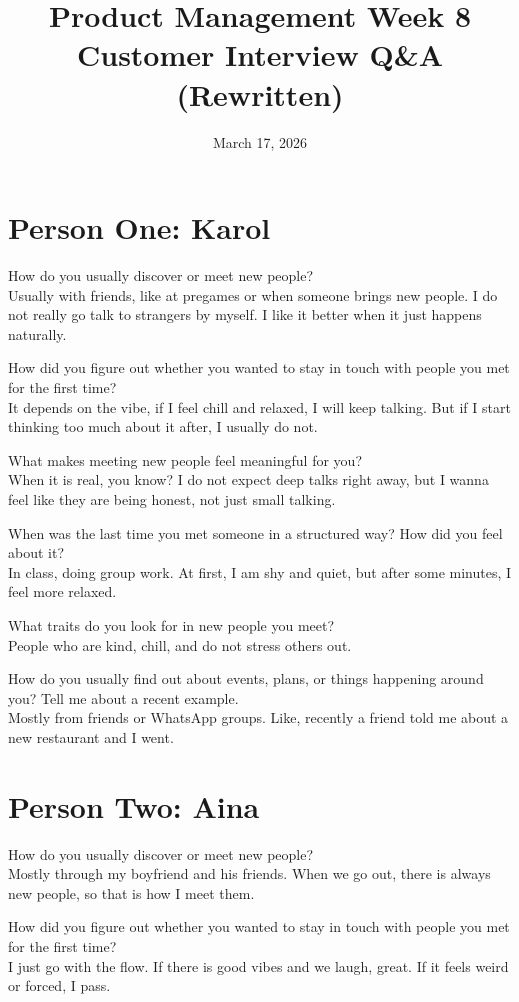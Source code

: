 \documentclass[11pt]{article}
\title{Product Management Week 8\\Customer Interview Q\&A (Rewritten)}
\author{March 17, 2026}
\date{}
\begin{document}
\maketitle

\section*{Person One: Karol}
How do you usually discover or meet new people?\\
Usually with friends, like at pregames or when someone brings new people. I do not really go talk to strangers by myself. I like it better when it just happens naturally.

How did you figure out whether you wanted to stay in touch with people you met for the first time?\\
It depends on the vibe, if I feel chill and relaxed, I will keep talking. But if I start thinking too much about it after, I usually do not.

What makes meeting new people feel meaningful for you?\\
When it is real, you know? I do not expect deep talks right away, but I wanna feel like they are being honest, not just small talking.

When was the last time you met someone in a structured way? How did you feel about it?\\
In class, doing group work. At first, I am shy and quiet, but after some minutes, I feel more relaxed.

What traits do you look for in new people you meet?\\
People who are kind, chill, and do not stress others out.

How do you usually find out about events, plans, or things happening around you? Tell me about a recent example.\\
Mostly from friends or WhatsApp groups. Like, recently a friend told me about a new restaurant and I went.

\section*{Person Two: Aina}
How do you usually discover or meet new people?\\
Mostly through my boyfriend and his friends. When we go out, there is always new people, so that is how I meet them.

How did you figure out whether you wanted to stay in touch with people you met for the first time?\\
I just go with the flow. If there is good vibes and we laugh, great. If it feels weird or forced, I pass.
\end{document}
